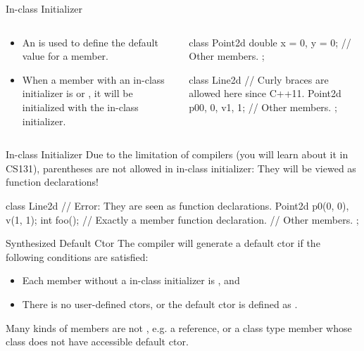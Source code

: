 \documentclass{beamer}
\begin{document}
\begin{frame}[fragile]{In-class Initializer}
    \begin{columns}
        \begin{column}{0.5\linewidth}
            \begin{itemize}
                \item An  is used to define the default value for a member.
                \item When a member with an in-class initializer is  or , it will be initialized with the in-class initializer.
            \end{itemize}
        \end{column}
        \begin{column}{0.5\linewidth}
            \begin{cpp}
class Point2d {
  double x = 0, y = 0;
  // Other members.
};

class Line2d {
  // Curly braces are allowed here since C++11.
  Point2d p0{0, 0}, v{1, 1};
  // Other members.
};
            \end{cpp}
        \end{column}
    \end{columns}
\end{frame}

\begin{frame}[fragile]{In-class Initializer}
    Due to the limitation of compilers (you will learn about it in CS131), parentheses are not allowed in in-class initializer: They will be viewed as function declarations!
    \begin{cpp}
class Line2d {
  // Error: They are seen as function declarations.
  Point2d p0(0, 0), v(1, 1);
  int foo(); // Exactly a member function declaration.
  // Other members.
};
    \end{cpp}
\end{frame}

\begin{frame}{Synthesized Default Ctor}
    The compiler will generate a default ctor if the following conditions are satisfied:
    \begin{itemize}
        \item Each member without a in-class initializer is , and
        \item There is no user-defined ctors, or the default ctor is defined as .
    \end{itemize}
    Many kinds of members are not , e.g. a reference, or a class type member whose class does not have accessible default ctor.
\end{frame}
\end{document}
